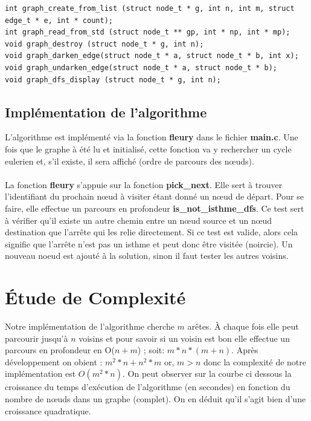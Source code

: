 \documentclass[12pt,a4paper,utf8x]{report}
\begin{document}
    \begin{lstlisting}
int graph_create_from_list (struct node_t * g, int n, int m, struct edge_t * e, int * count);
int graph_read_from_std (struct node_t ** gp, int * np, int * mp);
void graph_destroy (struct node_t * g, int n);
void graph_darken_edge(struct node_t * a, struct node_t * b, int x);
void graph_undarken_edge(struct node_t * a, struct node_t * b);
void graph_dfs_display (struct node_t * g, int n);
    \end{lstlisting}

    \subsection{Implémentation de l'algorithme}
L'algorithme est implémenté via la fonction \textbf{fleury} dans le fichier \textbf{main.c}. Une fois que le graphe à été lu et initialisé, cette fonction va y rechercher un cycle eulerien et, s'il existe, il sera affiché (ordre de parcours des nœuds).
 \\ \\ 
 \indent La fonction \textbf{fleury} s'appuie sur la fonction \textbf{pick\_next}. Elle sert à trouver l'identifiant du prochain nœud à visiter étant donné un nœud de départ. Pour se faire, elle effectue un parcours en profondeur \textbf{is\_not\_isthme\_dfs}. Ce test sert à vérifier qu'il existe un autre chemin entre un nœud source et un nœud destination que l'arrête qui les relie directement. Si ce test est valide, alors cela signifie que l'arrête n'est pas un isthme et peut donc être visitée (noircie). Un nouveau noeud est ajouté à la solution, sinon il faut tester les autres voisins.

  \section{Étude de Complexité}
Notre implémentation de l'algorithme cherche $m$ arêtes. À chaque fois elle peut parcourir jusqu'à $n$ voisins et pour savoir si un voisin est bon elle effectue un parcours en profondeur en O($n + m$) ; 
soit: $m * n * (m + n)$. Après développement on obient : $m^2*n+n^2*m$ or, $m>n$ donc la complexité de notre implémentation est $O(m^2*n)$. On peut observer sur la courbe ci dessous la croissance du temps d'exécution de l'algorithme (en secondes) en fonction du nombre de nœuds dans un graphe (complet). On en déduit qu'il s'agit bien d'une croissance quadratique.
\end{document}
